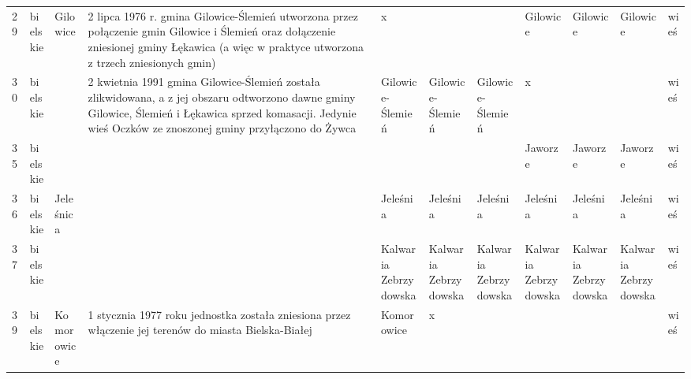 \begin{table}[]
\begin{tabular}{lllllllllll}
29  & bielskie    & Gilowice      & 2 lipca 1976 r. gmina Gilowice-Ślemień utworzona przez połączenie gmin Gilowice i Ślemień oraz dołączenie zniesionej gminy Łękawica (a więc w praktyce utworzona z trzech zniesionych gmin)                    & x                              &                       &                       & Gilowice              & Gilowice              & Gilowice              & wieś   \\
30  & bielskie    &               & 2 kwietnia 1991 gmina Gilowice-Ślemień została zlikwidowana, a z jej obszaru odtworzono dawne gminy Gilowice, Ślemień i Łękawica sprzed komasacji. Jedynie wieś Oczków ze znoszonej gminy przyłączono do Żywca & Gilowice-Ślemień               & Gilowice-Ślemień      & Gilowice-Ślemień      & x                     &                       &                       & wieś   \\
35  & bielskie    &               &                                                                                                                                                                                                                &                                &                       &                       & Jaworze               & Jaworze               & Jaworze               & wieś   \\
36  & bielskie    & Jeleśnica     &                                                                                                                                                                                                                & Jeleśnia                       & Jeleśnia              & Jeleśnia              & Jeleśnia              & Jeleśnia              & Jeleśnia              & wieś   \\
37  & bielskie    &               &                                                                                                                                                                                                                & Kalwaria Zebrzydowska          & Kalwaria Zebrzydowska & Kalwaria Zebrzydowska & Kalwaria Zebrzydowska & Kalwaria Zebrzydowska & Kalwaria Zebrzydowska & wieś   \\
39  & bielskie    & Komorowice    & 1 stycznia 1977 roku jednostka została zniesiona przez włączenie jej terenów do miasta Bielska-Białej                                                                                                          & Komorowice                     & x                     &                       &                       &                       &                       & wieś   \\

\end{tabular}
\end{table}
